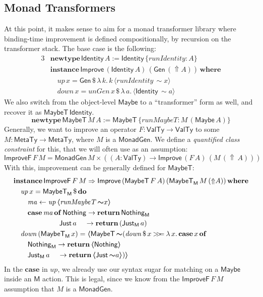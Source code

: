 \documentclass[acmsmall,screen,review,anonymous]{acmart}
\newcommand{\mit}[1]{\mathit{#1}}
\newcommand{\msf}[1]{\mathsf{#1}}
\newcommand{\mbf}[1]{\mathbf{#1}}
\newcommand{\bs}[1]{\boldsymbol{#1}}
\newcommand{\mdo}{\mbf{do}\,}
\newcommand{\ind}{\hspace{1em}}
\newcommand{\return}{\mbf{return}\,}
\newcommand{\lam}{\lambda\,}
\newcommand{\where}{\mbf{where}}
\newcommand{\M}{\msf{M}}
\newcommand{\of}{\mbf{of}\,}
\newcommand{\vma}{\mit{ma}}
\newcommand{\fro}{\leftarrow}
\newcommand{\case}{\mbf{case\,}}
\newcommand{\Lift}{{\Uparrow}}
\newcommand{\Up}{{\Uparrow}}
\newcommand{\spl}{{\bs{\sim}}}
\newcommand{\ql}{{\bs{\langle}}}
\newcommand{\qr}{{\bs{\rangle}}}
\newcommand{\bind}{\mathbin{>\!\!>\mkern-6.7mu=}}
\newcommand{\MTy}{\msf{MetaTy}}
\newcommand{\VTy}{\msf{ValTy}}
\newcommand{\Maybe}{\msf{Maybe}}
\newcommand{\MaybeT}{\msf{MaybeT}}
\newcommand{\Nothing}{\msf{Nothing}}
\newcommand{\Just}{\msf{Just}}
\theoremstyle{remark}
\newcommand{\mup}{\mit{up}}
\newcommand{\mdown}{\mit{down}}
\newcommand{\instance}{\mbf{instance}\,}
\newcommand{\Improve}{\msf{Improve}}
\newcommand{\Gen}{\msf{Gen}}
\newcommand{\unGen}{\mit{unGen}}
\newcommand{\qt}[1]{\ql#1\qr}
\newcommand{\MonadGen}{\msf{MonadGen}}
\newcommand{\RA}{\Rightarrow}
\newcommand{\Identity}{\msf{Identity}}
\newcommand{\runIdentity}{\mit{runIdentity}}
\newcommand{\newtype}{\mbf{newtype}\,}
\newcommand{\runMaybeT}{\mit{runMaybeT}}
\newcommand{\dlr}{\,\$\,}
\newcommand{\ImproveF}{\msf{ImproveF}}
\begin{document}
\subsection{Monad Transformers}\label{monad-transformers}

At this point, it makes sense to aim for a monad transformer library where
binding-time improvement is defined compositionally, by recursion on the
transformer stack. The base case is the following:
\begin{alignat*}{3}
  & \newtype \Identity\,A := \Identity\,\{\runIdentity : A\} \\
  & \instance \Improve\,(\Identity\,A)\,(\Gen\,(\Up A))\,\where\\
  & \ind \mup\,x = \Gen \dlr \lam k.\,k\,\qt{\runIdentity\,\spl x}\\
  & \ind \mdown\,x = \unGen\,x \dlr \lam a.\,\qt{\Identity\,\spl a}
\end{alignat*}
We also switch from the object-level $\Maybe$ to a ``transformer'' form as well,
and recover it as $\MaybeT\,\Identity$.
\[ \newtype \MaybeT\,M\,A := \MaybeT\,\{\runMaybeT : M\,(\Maybe\,A)\} \]
Generally, we want to improve an operator $F : \VTy \to \VTy$ to some $M : \MTy
\to \MTy$, where $M$ is a $\MonadGen$. We define a \emph{quantified class
constraint} \cite{TODO} for this, that we will often use as an assumption:
\[ \ImproveF\,F\,M = \MonadGen\,M \times ((A : \VTy) \to \Improve\,(F\,A)\,(M\,(\Lift\,A))) \]
With this, improvement can be generally defined for $\MaybeT$:
\begin{alignat*}{3}
  &\instance \ImproveF\,F\,M \RA \Improve\,(\MaybeT\,F\,A)\,(\MaybeT_\M\,M\,(\Up A))\,\where\\
  &\ind \mup\,x = \MaybeT_\M \dlr \mdo\\
  &\ind\ind \vma \fro \mup\,\qt{\runMaybeT\,\spl x}\\
  &\ind\ind \case \vma\,\of \Nothing \to \return \Nothing_\M\\
  &\hspace{6.5em}         \Just\,a \hspace{1.15em}\to \return (\Just_\M\,a)\\
  &\ind \mdown\,(\MaybeT_\M\,x) = \qt{\MaybeT\,\spl(\mdown \dlr x \bind \lam x.\,\case x\,\of\\
  &\ind\ind\Nothing_\M \to \return \qt{\Nothing}\\
  &\ind\ind\Just_\M\,a\hspace{1.15em} \to \return \qt{\Just\,\spl a})}
\end{alignat*}
In the $\mbf{case}$ in $\mup$, we already use our syntax sugar for matching on a $\Maybe$
inside an $\M$ action. This is legal, since we know from the $\ImproveF\,F\,M$ assumption
that $M$ is a $\MonadGen$.
\end{document}

